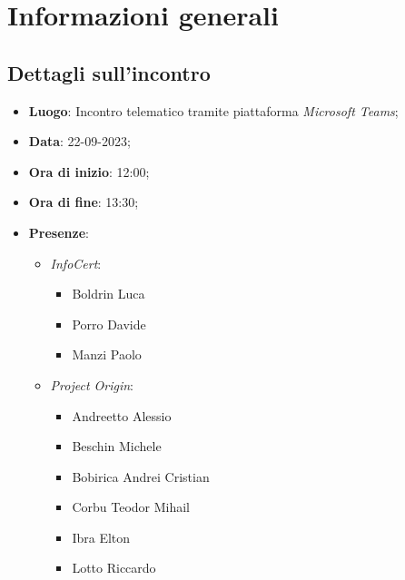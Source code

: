 \section{Informazioni generali}

\subsection{Dettagli sull'incontro}
\begin{itemize}
\item \textbf{Luogo}: Incontro telematico tramite piattaforma \textit{Microsoft Teams\glo};
\item \textbf{Data}: 22-09-2023;
\item \textbf{Ora di inizio}: 12:00;
\item \textbf{Ora di fine}: 13:30;
\item \textbf{Presenze}: 
\begin{itemize}
    \item \textit{InfoCert}: \begin{itemize}
            \item Boldrin Luca
            \item Porro Davide 
            \item Manzi Paolo
        \end{itemize}  
    \item \textit{Project Origin}:  \begin{itemize}
        \item Andreetto Alessio
        \item Beschin Michele
        \item Bobirica Andrei Cristian 
        \item Corbu Teodor Mihail
        \item Ibra Elton
        \item Lotto Riccardo
    \end{itemize}	
\end{itemize}
\end{itemize}




